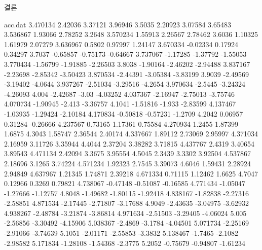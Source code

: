 \documentclass[Junlampaper, portrait]{Junlam_PosterK}
\begin{document}
\begin{poster}
\begin{posterbox}[name=result,column=3,]{결론  }
\begin{filecontents}{acc.dat}
                3.470134	2.42036	3.37121	3.96946
                3.5035	2.20923	3.07584	3.65483
                3.536867	1.93066	2.78252	3.2648
                3.570234	1.55913	2.26567	2.78462
                3.6036	1.10325	1.61979	2.07279
                3.636967	0.5802	0.97997	1.24147
                3.670334	-0.02334	0.17924	0.34297
                3.7037	-0.65857	-0.75173	-0.64667
                3.737067	-1.17285	-1.37792	-1.55053
                3.770434	-1.56799	-1.91885	-2.26503
                3.8038	-1.90164	-2.46202	-2.94488
                3.837167	-2.23698	-2.85342	-3.50423
                3.870534	-2.44391	-3.05384	-3.83199
                3.9039	-2.49569	-3.19402	-4.0644
                3.937267	-2.51034	-3.29516	-4.2654
                3.970634	-2.5445	-3.24324	-4.26093
                4.004	-2.42687	-3.03	-4.03252
                4.037367	-2.16947	-2.75013	-3.75746
                4.070734	-1.90945	-2.413	-3.36757
                4.1041	-1.51816	-1.933	-2.83599
                4.137467	-1.03935	-1.29424	-2.10184
                4.170834	-0.50818	-0.57231	-1.2709
                4.2042	0.06957	0.31284	-0.26666
                4.237567	0.73165	1.17361	0.75584
                4.270934	1.2455	1.87399	1.6875
                4.3043	1.58747	2.36544	2.40174
                4.337667	1.89112	2.73069	2.95997
                4.371034	2.16959	3.11726	3.35944
                4.4044	2.37204	3.38282	3.71815
                4.437767	2.4319	3.40654	3.89543
                4.471134	2.42094	3.3675	3.95554
                4.5045	2.3439	3.3302	3.92504
                4.537867	2.18696	3.1265	3.74224
                4.571234	1.92323	2.7545	3.39073
                4.6046	1.59431	2.28924	2.94849
                4.637967	1.21345	1.74871	2.39218
                4.671334	0.71115	1.12462	1.6625
                4.7047	0.12966	0.3269	0.79821
                4.738067	-0.47148	-0.51087	-0.16585
                4.771434	-1.05047	-1.27666	-1.12757
                4.8048	-1.49682	-1.80115	-1.92418
                4.838167	-1.82838	-2.27316	-2.58851
                4.871534	-2.17445	-2.71807	-3.17688
                4.9049	-2.43635	-3.04975	-3.62932
                4.938267	-2.48784	-3.21874	-3.86814
                4.971634	-2.51503	-3.29405	-4.06024
                5.005	-2.56856	-3.30492	-4.15906
                5.038367	-2.4869	-3.1784	-4.04501
                5.071734	-2.25169	-2.91066	-3.74639
                5.1051	-2.01171	-2.55853	-3.3832
                5.138467	-1.7465	-2.1082	-2.98582
                5.171834	-1.28108	-1.54368	-2.3775
                5.2052	-0.75679	-0.94807	-1.61234

\end{filecontents}
\end{posterbox}
\end{poster}
\end{document}
